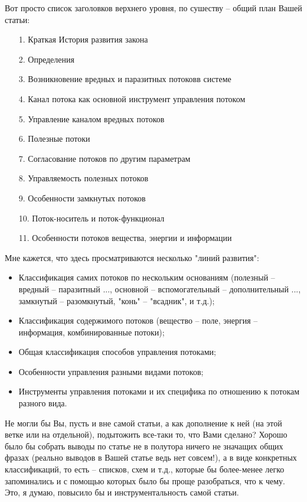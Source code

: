 \documentclass[a4paper,11pt]{article}
\begin{document}
Вот просто список заголовков верхнего уровня, по сушеству -- общий план Вашей
статьи:
\begin{itemize}
\item[1.] Краткая История развития закона
\item[2.] Определения
\item[3.] Возникновение вредных и паразитных потоковв системе
\item[4.] Канал потока как основной инструмент управления потоком
\item[5.] Управление каналом вредных потоков
\item[6.] Полезные потоки
\item[7.] Согласование потоков по другим параметрам
\item[8.] Управляемость полезных потоков
\item[9.] Особенности замкнутых потоков
\item[10.] Поток-носитель и поток-функционал
\item[11.] Особенности потоков вещества, энергии и информации
\end{itemize}
Мне кажется, что здесь просматриваются несколько "линий развития":
\begin{itemize}
\item Классификация самих потоков по нескольким основаниям (полезный --
  вредный -- паразитный ..., основной -- вспомогательный -- дополнительный
  ..., замкнутый -- разомкнутый, "конь" -- "всадник", и т.д.);
\item Классификация содержимого потоков (вещество -- поле, энергия --
  информация, комбинированные потоки);
\item Общая классификация способов управления потоками;
\item Особенности управления разными видами потоков;
\item Инструменты управления потоками и их специфика по отношению к потокам
  разного вида.
\end{itemize}
Не могли бы Вы, пусть и вне самой статьи, а как дополнение к ней (на этой
ветке или на отдельной), подытожить все-таки то, что Вами сделано? Хорошо было
бы собрать выводы по статье не в полутора ничего не значащих общих фразах
(реально выводов в Вашей статье ведь нет совсем!), а в виде конкретных
классификаций, то есть -- списков, схем и т.д., которые бы более-менее легко
запоминались и с помощью которых было бы проще разобраться, что к чему. Это, я
думаю, повысило бы и инструментальность самой статьи.
\end{document}
